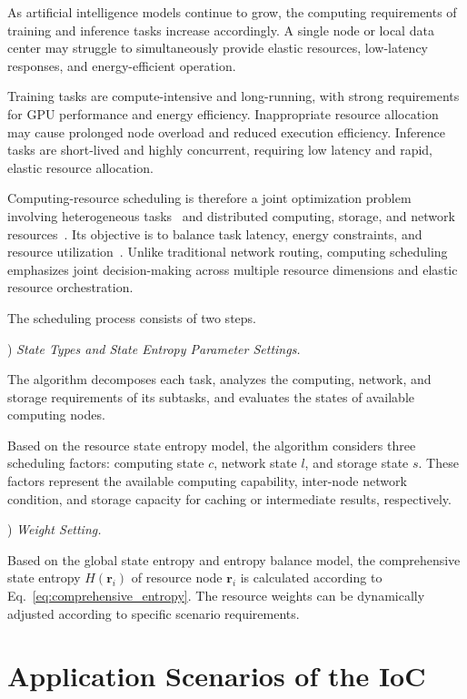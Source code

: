 \documentclass{ccjnl}
\begin{document}
As artificial intelligence models continue to grow, the computing
requirements of training and inference tasks increase accordingly. A
single node or local data center may struggle to simultaneously
provide elastic resources, low-latency responses, and energy-efficient
operation.

Training tasks are compute-intensive and long-running, with strong
requirements for GPU performance and energy efficiency. Inappropriate
resource allocation may cause prolonged node overload and reduced
execution efficiency. Inference tasks are short-lived and highly
concurrent, requiring low latency and rapid, elastic resource
allocation.

Computing-resource scheduling is therefore a joint optimization
problem involving heterogeneous tasks~\cite{23} and distributed
computing, storage, and network resources~\cite{24}. Its objective is
to balance task latency, energy constraints, and resource
utilization~\cite{29}. Unlike traditional network routing, computing
scheduling emphasizes joint decision-making across multiple resource
dimensions and elastic resource orchestration.

The scheduling process consists of two steps.
\par
{}
) \textit{State Types and State Entropy Parameter Settings.}\par

The algorithm decomposes each task, analyzes the computing, network,
and storage requirements of its subtasks, and evaluates the states of
available computing nodes.

Based on the resource state entropy model, the algorithm considers
three scheduling factors: computing state $c$, network state
$l$, and storage state $s$. These factors represent the available
computing capability, inter-node network condition, and storage
capacity for caching or intermediate results, respectively.
\par
{}
) \textit{Weight Setting.}\par

Based on the global state entropy and entropy balance model, the comprehensive state entropy $H(\mathbf{r}_i)$ of resource node $\mathbf{r}_i$ is calculated according to Eq.~\eqref{eq:comprehensive_entropy}. The resource weights can be dynamically adjusted according to specific scenario requirements.

\section{Application Scenarios of the IoC}
\label{s5}
\end{document}

